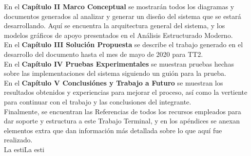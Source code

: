 En el \textbf{Capítulo II Marco Conceptual} se mostrarán todos los diagramas y documentos generados al analizar y generar un diseño del sistema que se estará desarrollando. Aquí se encuentra la arquitectura general del sistema, y los modelos gráficos de apoyo presentados en el Análisis Estructurado Moderno.\\

En el \textbf{Capítulo III Soluci\'on Propuesta} se describe el trabajo generado en el desarrollo del documento hasta el mes de mayo de 2020 para TT2.\\

En el \textbf{Capítulo IV Pruebas Experimentales} se muestran pruebas hechas sobre las implementaciones del sistema siguiendo un guión para la prueba.\\
 
En el \textbf{Capítulo V Conclusiónes y Trabajo a Futuro} se muestran los resultados obtenidos y experiencias para mejorar el proceso, así como la vertiente para continuar con el trabajo y las conclusiones del integrante.\\

Finalmente, se encuentran las Referencias de todos los recursos empleados para dar soporte y estructura a este Trabajo Terminal, y en los apéndices se anexan elementos extra que dan información más detallada sobre lo que aquí fue realizado.\\
La estiLa esti